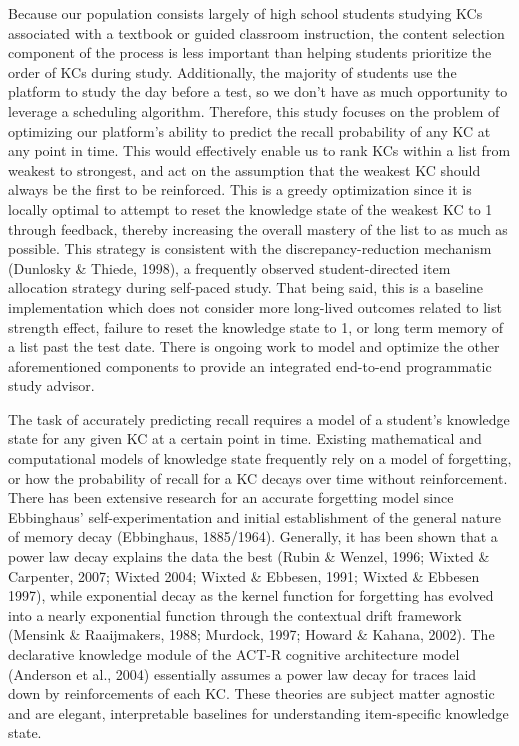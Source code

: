\documentclass[a4paper,12pt]{article}
\begin{document}
Because our population consists largely of high school students studying KCs associated with a textbook or guided classroom instruction, the content selection component of the process is less important than helping students prioritize the order of KCs during study. Additionally, the majority of students use the platform to study the day before a test, so we don't have as much opportunity to leverage a scheduling algorithm. Therefore, this study focuses on the problem of optimizing our platform's ability to predict the recall probability of any KC at any point in time. This would effectively enable us to rank KCs within a list from weakest to strongest, and act on the assumption that the weakest KC should always be the first to be reinforced. This is a greedy optimization since it is locally optimal to attempt to reset the knowledge state of the weakest KC to 1 through feedback, thereby increasing the overall mastery of the list to as much as possible. This strategy is consistent with the discrepancy-reduction mechanism (Dunlosky \& Thiede, 1998), a frequently observed student-directed item allocation strategy during self-paced study. That being said, this is a baseline implementation which does not consider more long-lived outcomes related to list strength effect, failure to reset the knowledge state to 1, or long term memory of a list past the test date. There is ongoing work to model and optimize the other aforementioned components to provide an integrated end-to-end programmatic study advisor.

The task of accurately predicting recall requires a model of a student's knowledge state for any given KC at a certain point in time. Existing mathematical and computational models of knowledge state frequently rely on a model of forgetting, or how the probability of recall for a KC decays over time without reinforcement. There has been extensive research for an accurate forgetting model since Ebbinghaus' self-experimentation and initial establishment of the general nature of memory decay (Ebbinghaus, 1885/1964). Generally, it has been shown that a power law decay explains the data the best (Rubin \& Wenzel, 1996; Wixted \& Carpenter, 2007; Wixted 2004; Wixted \& Ebbesen, 1991; Wixted \& Ebbesen 1997), while exponential decay as the kernel function for forgetting has evolved into a nearly exponential function through the contextual drift framework (Mensink \& Raaijmakers, 1988; Murdock, 1997; Howard \& Kahana, 2002). The declarative knowledge module of the ACT-R cognitive architecture model (Anderson et al., 2004) essentially assumes a power law decay for traces laid down by reinforcements of each KC. These theories are subject matter agnostic and are elegant, interpretable baselines for understanding item-specific knowledge state. 
\end{document}
